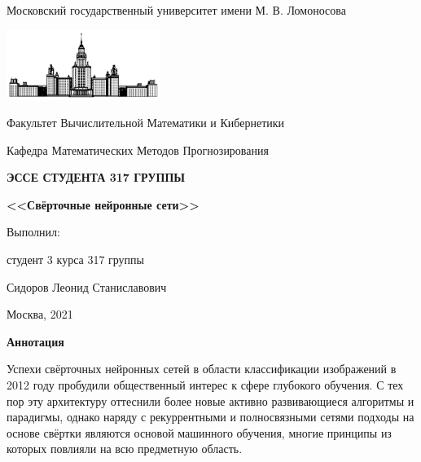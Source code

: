 \documentclass[12pt, fleqn]{article}
\begin{document}
\begin{titlepage}
    \begin{center}
        Московский государственный университет имени М. В. Ломоносова
        
        \includegraphics[width=50mm]{./pics/msu.jpg}
        
        \bigbreak
        Факультет Вычислительной Математики и Кибернетики

        Кафедра Математических Методов Прогнозирования

        \vspace{10mm}

        \textbf{\large ЭССЕ СТУДЕНТА 317 ГРУППЫ}

        \vspace{10mm}

        \textbf{\Large <<Свёрточные нейронные сети>>}

        \vspace{10mm}
        
        \begin{flushright}
            \parbox{0.5\textwidth}{
                Выполнил:

                студент 3 курса 317 группы
                
                Сидоров Леонид Станиславович
            }
        \end{flushright}
        \vspace{\fill}
        Москва, 2021   
    \end{center}
\end{titlepage}

\newpage
    \begin{center}
        \textbf{Аннотация}
    \end{center}

    Успехи свёрточных нейронных сетей в области классификации изображений в 2012 году пробудили общественный интерес к сфере глубокого 
    обучения. С тех пор эту архитектуру оттеснили более новые активно развивающиеся алгоритмы и парадигмы, однако наряду с рекуррентными 
    и полносвязными сетями подходы на основе свёртки являются основой машинного обучения, многие принципы из которых повлияли на всю 
    предметную область.
\end{document}
